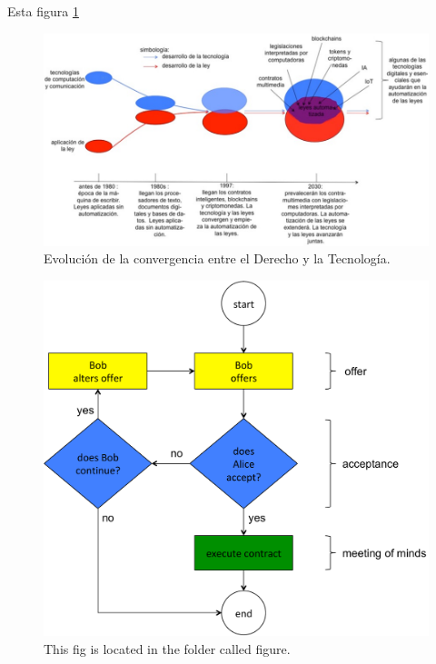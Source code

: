 \documentclass[12pt]{report} %
\begin{document}
Esta figura \ref{fig:convergencia}

\begin{figure}
\centering
\includegraphics[width=1.0\columnwidth]{imagenes/convergencia.pdf}
\caption{Evolución de la convergencia entre el Derecho y la Tecnología.}
\label{fig:convergencia}
\end{figure}





\begin{figure}
\centering
\includegraphics[width=1.0\columnwidth]{figures/civilcontractformation.pdf}
\caption{This fig is located in the
 folder called figure.}
\label{fig:civilcontractformation}
\end{figure}
\end{document}
